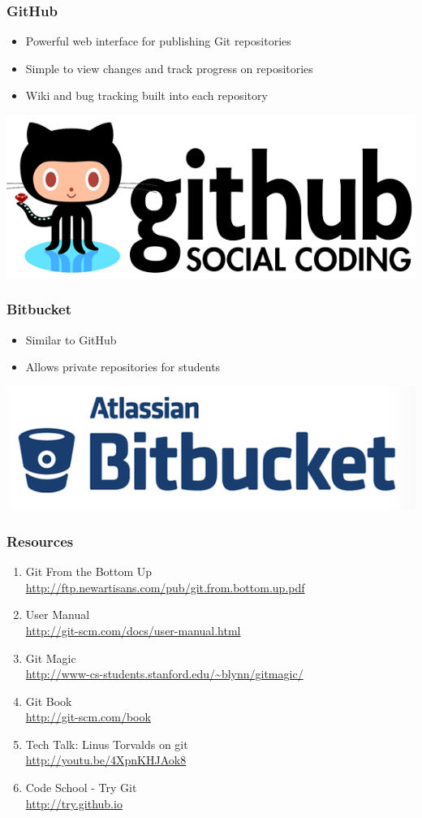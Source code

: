 \documentclass[english,compress]{beamer}
\begin{document}
\frame
{
    \frametitle{GitHub}

    \begin{itemize}
        \item Powerful web interface for publishing Git repositories
        \item Simple to view changes and track progress on repositories
        \item Wiki and bug tracking built into each repository 
    \end{itemize}
    
    \begin{center}
        \includegraphics[width=.8\textwidth]{figs/github-logo.png}
    \end{center}
}

\frame
{
    \frametitle{Bitbucket}

    \begin{itemize}
        \item Similar to GitHub
        \item Allows private repositories for students
    \end{itemize}
    
    \begin{center}
        \includegraphics[width=.8\textwidth]{figs/bitbucket-logo.png}
    \end{center}
}

\frame
{
\small
    \frametitle{Resources}
    \begin{enumerate}
        \item Git From the Bottom Up\\
            \url{http://ftp.newartisans.com/pub/git.from.bottom.up.pdf}
        \item User Manual\\
            \url{http://git-scm.com/docs/user-manual.html}
        \item Git Magic\\
            \url{http://www-cs-students.stanford.edu/~blynn/gitmagic/}
        \item Git Book\\
            \url{http://git-scm.com/book}
        \item Tech Talk: Linus Torvalds on git\\
            \url{http://youtu.be/4XpnKHJAok8} 
        \item Code School - Try Git\\
            \url{http://try.github.io}
    \end{enumerate}
}
\end{document}

